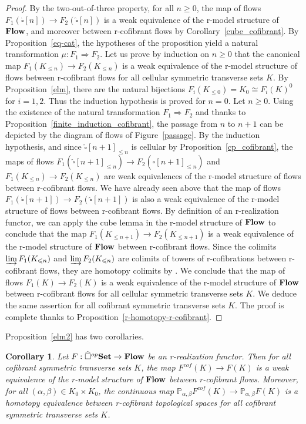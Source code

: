\documentclass[a4paper,12pt]{amsart}
\newcommand{\p}{\times}
\newtheorem{cor}[thm]{Corollary}
\newcommand{\bpf}{\begin{proof}}
\newcommand{\epf}{\end{proof}}
\theoremstyle{definition}
\newcommand{\iso}{\cong}
\renewcommand{\leq}{\leqslant}
\renewcommand{\geq}{\geqslant}
\newcommand{\brm}[1]{{\rm{\mathbf{#1}}}}
\newcommand{\dtop}{{\brm{Flow}}}
\newcommand{\set}{{\brm{Set}}}
\newcommand{\ttt}{two-out-of-three property}
\newcommand{\liminj}{\varinjlim}
\renewcommand{\P}{\mathbb{P}}
\begin{document}
\bpf
By the \ttt, for all $n\geq 0$, the map of flows $F_1(\widehat{\square}[n])\to F_2(\widehat{\square}[n])$ is a weak equivalence of the r-model structure of $\dtop$, and moreover between r-cofibrant flows by Corollary~\ref{cube_cofibrant}. By Proposition~\ref{eq-cat}, the hypotheses of the proposition yield a natural transformation $\mu:F_1\Rightarrow F_2$. Let us prove by induction on $n\geq 0$ that the canonical map $F_1(K_{\leq n}) \to F_2(K_{\leq n})$ is a weak equivalence of the r-model structure of flows between r-cofibrant flows for all cellular symmetric transverse sets $K$. By Proposition~\ref{elm}, there are the natural bijections $F_i(K_{\leq 0}) = K_0\iso F_i(K)^0$ for $i=1,2$. Thus the induction hypothesis is proved for $n=0$. Let $n\geq 0$. Using the existence of the natural transformation $F_1\Rightarrow F_2$ and thanks to Proposition~\ref{finite_induction_cofibrant}, the passage from $n$ to $n+1$ can be depicted by the diagram of flows of Figure~\ref{passage}. By the induction hypothesis, and since $\widehat{\square}[n+1]_{\leq n}$ is cellular by Proposition~\ref{cp_cofibrant}, the maps of flows $F_1(\widehat{\square}[n+1]_{\leq n}) \to F_2(\widehat{\square}[n+1]_{\leq n})$ and $F_1(K_{\leq n}) \to F_2(K_{\leq n})$ are weak equivalences of the r-model structure of flows between r-cofibrant flows. We have already seen above that the map of flows $F_1(\widehat{\square}[n+1]) \to F_2(\widehat{\square}[n+1])$ is also a weak equivalence of the r-model structure of flows between r-cofibrant flows. By definition of an r-realization functor, we can apply the cube lemma \cite[Proposition~15.10.10]{ref_model2} \cite[Lemma~5.2.6]{MR99h:55031} in the r-model structure of $\dtop$ to conclude that the map $F_1(K_{\leq n+1})\to F_2(K_{\leq n+1})$ is a weak equivalence of the r-model structure of $\dtop$ between r-cofibrant flows. Since the colimits $\liminj F_1(K_{\leq n})$ and $\liminj F_2(K_{\leq n})$ are colimits of towers of r-cofibrations between r-cofibrant flows, they are homotopy colimits by \cite[Proposition~15.10.12]{ref_model2}. We conclude that the map of flows $F_1(K)\to F_2(K)$ is a weak equivalence of the r-model structure of $\dtop$ between r-cofibrant flows for all cellular symmetric transverse sets $K$. We deduce the same assertion for all cofibrant symmetric transverse sets $K$. The proof is complete thanks to Proposition~\ref{r-homotopy-r-cofibrant}. 
\epf


Proposition~\ref{elm2} has two corollaries.

\begin{cor} \label{q1}
	Let $F:\widehat{\square}^{op}\set \to \dtop$ be an r-realization functor. Then for all cofibrant symmetric transverse sets $K$, the map $F^{cof}(K)\to F(K)$ is a weak equivalence of the r-model structure of $\dtop$ between r-cofibrant flows. Moreover, for all $(\alpha,\beta)\in K_0\p K_0$, the continuous map $\P_{\alpha,\beta}F^{cof}(K)\to \P_{\alpha,\beta}F(K)$ is a homotopy equivalence between r-cofibrant topological spaces for all cofibrant symmetric transverse sets $K$.
\end{cor}
\end{document}
